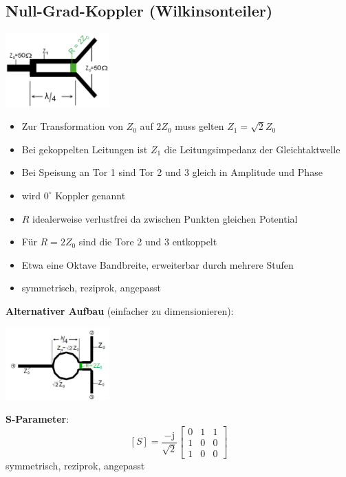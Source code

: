 \documentclass[english]{latex4ei/latex4ei_sheet}
\begin{document}
\begin{sectionbox}
    \subsection{Null-Grad-Koppler (Wilkinsonteiler)}
    \begin{center}\includegraphics[width = 4cm]{./img/wilkinsonteiler.png}\end{center}
    \begin{itemize}
        \item Zur Transformation von $Z_0$ auf $2Z_0$ muss gelten $Z_1 = \sqrt{2}Z_0$
        \item Bei gekoppelten Leitungen ist $Z_1$ die Leitungsimpedanz der Gleichtaktwelle
        \item Bei Speisung an Tor 1 sind Tor 2 und 3 gleich in Amplitude und Phase
        \item wird $0^{\circ}$ Koppler genannt
        \item $R$ idealerweise verlustfrei da zwischen Punkten gleichen Potential
        \item Für $R = 2Z_0$ sind die Tore 2 und 3 entkoppelt
        \item Etwa eine Oktave Bandbreite, erweiterbar durch mehrere Stufen
        \item symmetrisch, reziprok, angepasst
    \end{itemize}

    \textbf{Alternativer Aufbau} (einfacher zu dimensionieren):\\
    \begin{center}\includegraphics[width = 4cm]{./img/null_grad_koppler_rund.png}\end{center}
    \textbf{S-Parameter}:\\
    $$
        [S]=\frac{-\mathrm{j}}{\sqrt{2}}\left[\begin{array}{lll}
                0 & 1 & 1 \\
                1 & 0 & 0 \\
                1 & 0 & 0
            \end{array}\right]
    $$
    symmetrisch, reziprok, angepasst
\end{sectionbox}
\end{document}
